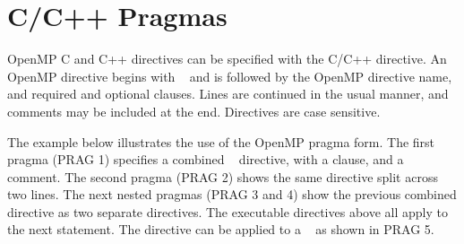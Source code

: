 \section{C/C++ Pragmas}
\label{sec:pragmas}

OpenMP C and C++ directives can be specified with the C/C++  directive.
An OpenMP directive begins with ~ and is followed by the 
OpenMP directive name, and required and optional clauses. Lines are continued in the 
usual manner, and comments may be included at the end.
Directives are case sensitive.

The example below illustrates the use of the OpenMP pragma form.
The first pragma (PRAG 1) specifies a combined ~ 
directive, with a  clause, and a comment. 
The second pragma (PRAG 2) shows the same directive split
across two lines. The next nested pragmas (PRAG 3 and 4) show the previous combined directive as 
two separate directives. The executable directives above all apply to the next 
statement. The  directive can be applied to a ~
as shown in PRAG 5.

